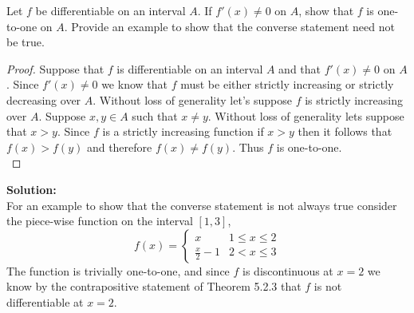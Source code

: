 \documentclass[12pt]{article}
\makeatletter
\theoremstyle{homework}
\newenvironment{exercise}[1]
{\def\@currentlabel{#1}\exercisecore}
{\endexercisecore}
\newcommand{\localhead}[1]{\par\smallskip\noindent\textbf{#1}\nobreak\\}%
\newcommand\solution{\localhead{Solution:}}
\makeatother
\begin{document}
\begin{exercise}{Abbott 5.3.2} Let $f$ be differentiable on an interval $A$. If $f'(x) \neq 0$ on $A$, show that $f$ is one-to-one on $A$.
  Provide an example to show that the converse statement need not be true.\\
  \begin{proof}
    Suppose that $f$ is differentiable on an interval $A$ and that $f'(x) \neq 0$ on $A$. Since $f'(x) \neq 0$ we know that $f$ must be either strictly increasing or strictly decreasing over $A$.
    Without loss of generality let's suppose $f$ is strictly increasing over $A$. Suppose $x,y \in A$ such that $x \neq y$. Without loss of generality lets suppose that $x > y$. Since $f$ is a strictly increasing function if 
    $x > y$ then it follows that $f(x) > f(y)$ and therefore $f(x) \neq f(y)$. Thus $f$ is one-to-one.\\
  \end{proof}
\vspace{.25in}

  \solution For an example to show that the converse statement is not always true consider the piece-wise function on the interval $[1,3]$,
  \begin{equation*}
    f(x) =  \begin{cases} 
      x & 1 \le x \le 2 \\
      \frac{x}{2} - 1 & 2 < x \le 3 
   \end{cases}
  \end{equation*}
  The function is trivially one-to-one, and since $f$ is discontinuous at $x = 2$ we know by the contrapositive statement of Theorem 5.2.3 that $f$ is not 
  differentiable at $x = 2$. 
\end{exercise}
\vspace{.5in}
\end{document}
